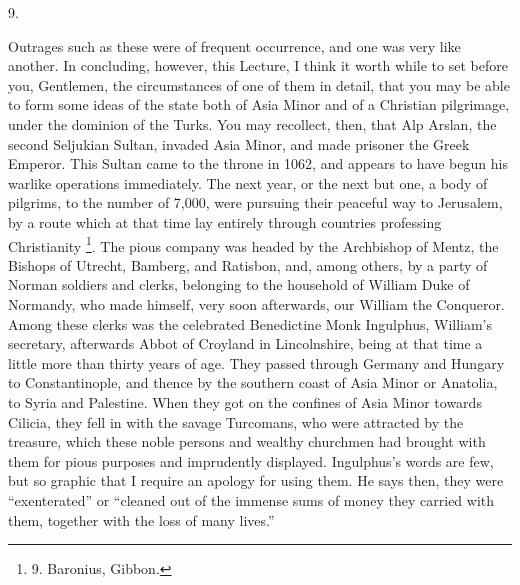 9.

Outrages such as these were of
frequent occurrence, and one was very like another. In concluding,
however, this Lecture, I think it worth while to set before you,
Gentlemen, the circumstances of one of them in detail, that you may be
able to form some ideas of the state both of Asia Minor and of a
Christian pilgrimage, under the dominion of the Turks. You may
recollect, then, that Alp Arslan, the second Seljukian Sultan, invaded
Asia Minor, and made prisoner the Greek Emperor. This Sultan came to
the throne in 1062, and appears to have begun his warlike operations
immediately. The next year, or the next but one, a body of pilgrims,
to the number of 7,000, were pursuing their peaceful way to Jerusalem,
by a route which at that time lay entirely through countries
professing Christianity \footnote{9.
Baronius, Gibbon.}.
The pious company was headed by the Archbishop of Mentz, the Bishops
of Utrecht, Bamberg, and Ratisbon, and, among others, by a party of
Norman soldiers and clerks, belonging to the household of William Duke
of Normandy, who made himself, very soon afterwards, our William the
Conqueror. Among these clerks was the celebrated Benedictine Monk
Ingulphus, William's secretary, afterwards Abbot of Croyland in
Lincolnshire, being at that time a little more than thirty years of
age. They passed through Germany and Hungary to Constantinople, and
thence by the southern coast of Asia Minor or Anatolia, to Syria and
Palestine. When they got on the confines of Asia Minor towards Cilicia,
they fell in with the savage Turcomans, who were attracted by the
treasure, which these noble persons and wealthy churchmen had brought
with them for pious purposes and imprudently displayed. Ingulphus's
words are few, but so graphic that I require an apology for using
them. He says then, they were ``exenterated'' or ``cleaned out of the
immense sums of money they carried with them, together with the loss
of many lives.''

